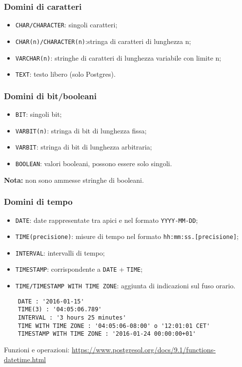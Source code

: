 \documentclass[a4paper, 10pt, titlepage]{article}
\begin{document}
	\subsubsection{Domini di caratteri}
	\begin{itemize}
		\item \lstinline|CHAR/CHARACTER|: singoli caratteri;
		\item \lstinline|CHAR(n)/CHARACTER(n)|:stringa di caratteri di lunghezza n;
		\item \lstinline|VARCHAR(n)|: stringhe di caratteri di lunghezza variabile con limite n;
		\item \lstinline|TEXT|: testo libero (solo Postgres).
	\end{itemize}

	\subsubsection{Domini di bit/booleani}
	\begin{itemize}
		\item \lstinline|BIT|: singoli bit;
		\item \lstinline|VARBIT(n)|: stringa di bit di lunghezza fissa;
		\item \lstinline|VARBIT|: stringa di bit di lunghezza arbitraria;
		\item \lstinline|BOOLEAN|: valori booleani, possono essere solo singoli.
	\end{itemize}
	\textbf{Nota:} non sono ammesse stringhe di booleani.
	
	\subsubsection{Domini di tempo}
	\begin{itemize}
		\item \lstinline|DATE|: date rappresentate tra apici e nel formato \verb|YYYY-MM-DD|;
		\item \lstinline|TIME(precisione)|: misure di tempo nel formato \verb|hh:mm:ss.[precisione]|;
		\item \lstinline|INTERVAL|: intervalli di tempo;
		\item \lstinline|TIMESTAMP|: corrispondente a \lstinline|DATE| + \lstinline|TIME|;
		\item \lstinline|TIME/TIMESTAMP WITH TIME ZONE|: aggiunta di indicazioni sul fuso orario.
	\end{itemize}
	\begin{lstlisting}
	DATE : '2016-01-15'
	TIME(3) : '04:05:06.789'
	INTERVAL : '3 hours 25 minutes'
	TIME WITH TIME ZONE : '04:05:06-08:00' o '12:01:01 CET'
	TIMESTAMP WITH TIME ZONE : '2016-01-24 00:00:00+01'
	\end{lstlisting}
	Funzioni e operazioni: \url{https://www.postgresql.org/docs/9.1/functions-datetime.html}
	
\end{document}

